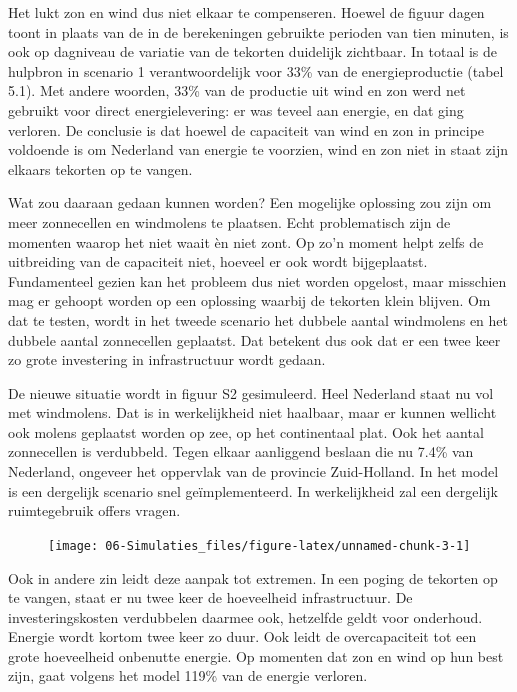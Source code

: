 \documentclass[
  11pt,
  a4paper,
]{book}
\begin{document}
Het lukt zon en wind dus niet elkaar te compenseren. Hoewel de figuur dagen toont in plaats van de in de berekeningen gebruikte perioden van tien minuten, is ook op dagniveau de variatie van de tekorten duidelijk zichtbaar. In totaal is de hulpbron in scenario 1 verantwoordelijk voor 33\% van de energieproductie (tabel 5.1). Met andere woorden, 33\% van de productie uit wind en zon werd net gebruikt voor direct energielevering: er was teveel aan energie, en dat ging verloren. De conclusie is dat hoewel de capaciteit van wind en zon in principe voldoende is om Nederland van energie te voorzien, wind en zon niet in staat zijn elkaars tekorten op te vangen.

Wat zou daaraan gedaan kunnen worden? Een mogelijke oplossing zou zijn om meer zonnecellen en windmolens te plaatsen. Echt problematisch zijn de momenten waarop het niet waait èn niet zont. Op zo'n moment helpt zelfs de uitbreiding van de capaciteit niet, hoeveel er ook wordt bijgeplaatst. Fundamenteel gezien kan het probleem dus niet worden opgelost, maar misschien mag er gehoopt worden op een oplossing waarbij de tekorten klein blijven. Om dat te testen, wordt in het tweede scenario het dubbele aantal windmolens en het dubbele aantal zonnecellen geplaatst. Dat betekent dus ook dat er een twee keer zo grote investering in infrastructuur wordt gedaan.

De nieuwe situatie wordt in figuur S2 gesimuleerd. Heel Nederland staat nu vol met windmolens. Dat is in werkelijkheid niet haalbaar, maar er kunnen wellicht ook molens geplaatst worden op zee, op het continentaal plat. Ook het aantal zonnecellen is verdubbeld. Tegen elkaar aanliggend beslaan die nu 7.4\% van Nederland, ongeveer het oppervlak van de provincie Zuid-Holland. In het model is een dergelijk scenario snel geïmplementeerd. In werkelijkheid zal een dergelijk ruimtegebruik offers vragen.

\begin{figure}

{\centering \texttt{[image: 06-Simulaties\_files/figure-latex/unnamed-chunk-3-1]} 

}

\end{figure}

Ook in andere zin leidt deze aanpak tot extremen. In een poging de tekorten op te vangen, staat er nu twee keer de hoeveelheid infrastructuur. De investeringskosten verdubbelen daarmee ook, hetzelfde geldt voor onderhoud. Energie wordt kortom twee keer zo duur. Ook leidt de overcapaciteit tot een grote hoeveelheid onbenutte energie. Op momenten dat zon en wind op hun best zijn, gaat volgens het model 119\% van de energie verloren.
\end{document}
